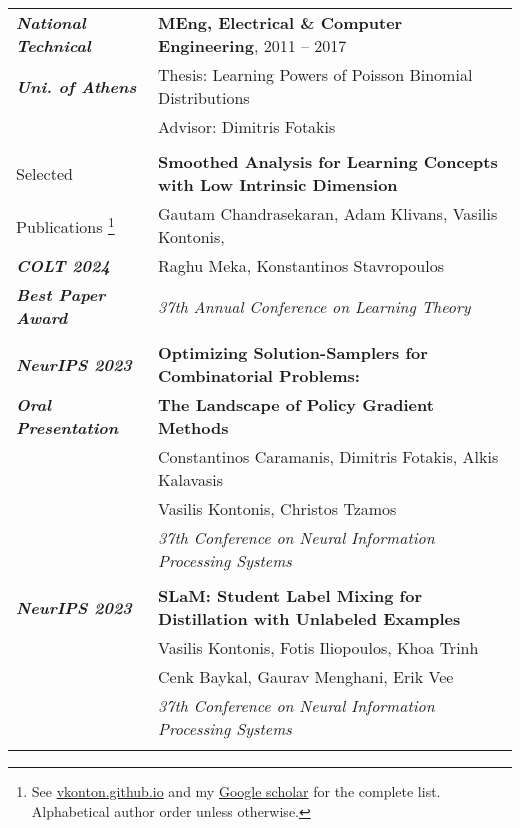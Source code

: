 \documentclass[letterpaper,11pt,oneside]{article}
\begin{document}
\begin{longtable}{@{} l l}
      \emph{\textbf{National Technical}}
     & \textbf{MEng, Electrical \& Computer Engineering}, 2011 -- 2017\\
     \emph{\textbf{Uni. of Athens} }
     & Thesis: Learning Powers of Poisson Binomial Distributions\\
     & Advisor: Dimitris Fotakis \\
     & \\


 \Large{Selected}  
 &\textbf{Smoothed Analysis for Learning Concepts with
 Low Intrinsic Dimension} \\
\Large{Publications \footnote{ 
See \href{https://vkonton.github.io}{vkonton.github.io} and
my \href{https://scholar.google.com/citations?user=7_44KWAAAAAJ&hl=el}{Google scholar} 
for the complete list.  
Alphabetical author order unless otherwise.
}}
 & Gautam Chandrasekaran, Adam Klivans, Vasilis Kontonis, \\
  \emph{\textbf{COLT 2024}} 
 & Raghu Meka, Konstantinos Stavropoulos \\
  \emph{\textbf{Best Paper Award}}
 & \emph{37th Annual Conference on Learning Theory} \\
 & \\

  \emph{\textbf{NeurIPS 2023}}
 &\textbf{Optimizing Solution-Samplers for Combinatorial Problems:}\\
  \emph{\textbf{Oral Presentation}} 
 &\textbf{The Landscape of Policy Gradient Methods}\\
 & Constantinos Caramanis, Dimitris Fotakis, Alkis Kalavasis\\
 & Vasilis Kontonis, Christos Tzamos\\
 & \emph{37th Conference on Neural Information Processing Systems} \\
 & \\

 \emph{\textbf{NeurIPS 2023}}
 &\textbf{SLaM: Student Label Mixing for Distillation with Unlabeled Examples} \\
 & Vasilis Kontonis, Fotis Iliopoulos, Khoa Trinh \\
 & Cenk Baykal, Gaurav Menghani, Erik Vee\\ 
 & \emph{37th Conference on Neural Information Processing Systems} \\
 & \\



\end{longtable}
\end{document}

